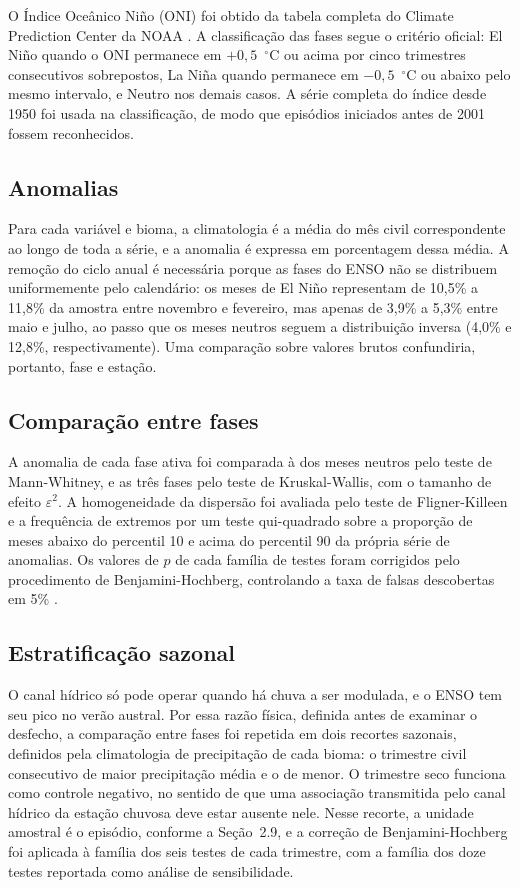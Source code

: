 \documentclass[a4paper,fleqn]{cas-sc}
\begin{document}
O Índice Oceânico Niño (ONI) foi obtido da tabela completa do Climate Prediction Center da NOAA \citep{noaacpc2025}. A classificação das fases segue o critério oficial: El Niño quando o ONI permanece em $+0{,}5$~$^{\circ}$C ou acima por cinco trimestres consecutivos sobrepostos, La Niña quando permanece em $-0{,}5$~$^{\circ}$C ou abaixo pelo mesmo intervalo, e Neutro nos demais casos. A série completa do índice desde 1950 foi usada na classificação, de modo que episódios iniciados antes de 2001 fossem reconhecidos.

\subsection{Anomalias}

Para cada variável e bioma, a climatologia é a média do mês civil correspondente ao longo de toda a série, e a anomalia é expressa em porcentagem dessa média. A remoção do ciclo anual é necessária porque as fases do ENSO não se distribuem uniformemente pelo calendário: os meses de El Niño representam de 10,5\% a 11,8\% da amostra entre novembro e fevereiro, mas apenas de 3,9\% a 5,3\% entre maio e julho, ao passo que os meses neutros seguem a distribuição inversa (4,0\% e 12,8\%, respectivamente). Uma comparação sobre valores brutos confundiria, portanto, fase e estação.

\subsection{Comparação entre fases}

A anomalia de cada fase ativa foi comparada à dos meses neutros pelo teste de Mann-Whitney, e as três fases pelo teste de Kruskal-Wallis, com o tamanho de efeito $\varepsilon^2$. A homogeneidade da dispersão foi avaliada pelo teste de Fligner-Killeen e a frequência de extremos por um teste qui-quadrado sobre a proporção de meses abaixo do percentil 10 e acima do percentil 90 da própria série de anomalias. Os valores de $p$ de cada família de testes foram corrigidos pelo procedimento de Benjamini-Hochberg, controlando a taxa de falsas descobertas em 5\% \citep{benjamini1995}.

\subsection{Estratificação sazonal}

O canal hídrico só pode operar quando há chuva a ser modulada, e o ENSO tem seu pico no verão austral. Por essa razão física, definida antes de examinar o desfecho, a comparação entre fases foi repetida em dois recortes sazonais, definidos pela climatologia de precipitação de cada bioma: o trimestre civil consecutivo de maior precipitação média e o de menor. O trimestre seco funciona como controle negativo, no sentido de que uma associação transmitida pelo canal hídrico da estação chuvosa deve estar ausente nele. Nesse recorte, a unidade amostral é o episódio, conforme a Seção~2.9, e a correção de Benjamini-Hochberg foi aplicada à família dos seis testes de cada trimestre, com a família dos doze testes reportada como análise de sensibilidade.
\end{document}
